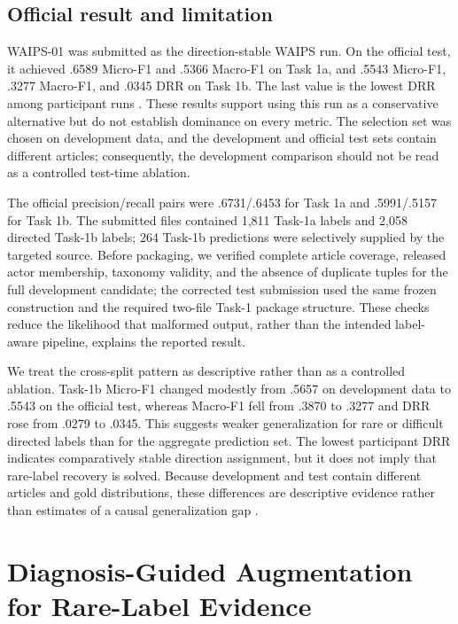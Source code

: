 \documentclass[sigconf,article,a4paper]{acmart}
\begin{document}
\subsection{Official result and limitation}

WAIPS-01 was submitted as the direction-stable WAIPS run. On the official test,
it achieved .6589 Micro-F1 and .5366 Macro-F1 on Task 1a, and .5543 Micro-F1,
.3277 Macro-F1, and .0345 DRR on Task 1b. The last value is the lowest DRR
among participant runs \cite{wangFehu2026}. These results support using this run
as a conservative alternative but do not establish dominance on every metric.
The selection set was chosen on development data, and the development and
official test sets contain different articles; consequently, the development
comparison should not be read as a controlled test-time ablation.

The official precision/recall pairs were .6731/.6453 for Task 1a and
.5991/.5157 for Task 1b. The submitted files contained 1,811 Task-1a labels and
2,058 directed Task-1b labels; 264 Task-1b predictions were selectively supplied
by the targeted source. Before packaging, we verified complete article coverage,
released actor membership, taxonomy validity, and the absence of duplicate
tuples for the full development candidate; the corrected test submission used
the same frozen construction and the required two-file Task-1 package structure.
These checks reduce the likelihood that malformed output, rather than the
intended label-aware pipeline, explains the reported result.

We treat the cross-split pattern as descriptive rather than as a controlled
ablation. Task-1b Micro-F1 changed modestly from .5657 on development data to
.5543 on the official test, whereas Macro-F1 fell from .3870 to .3277 and DRR
rose from .0279 to .0345. This suggests weaker generalization for rare or difficult
directed labels than for the aggregate prediction set. The lowest participant
DRR indicates comparatively stable direction assignment, but it does not imply
that rare-label recovery is solved. Because development and test
contain different articles and gold distributions, these differences are
descriptive evidence rather than estimates of a causal generalization gap
\cite{wangFehu2026}.

\section{Diagnosis-Guided Augmentation for Rare-Label Evidence}
\label{sec:augmentation}
\end{document}
